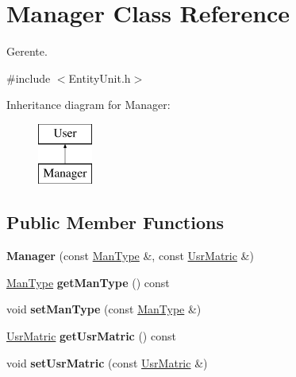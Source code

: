 \hypertarget{classManager}{\section{Manager Class Reference}
\label{classManager}
}


Gerente.  




{\ttfamily \#include $<$Entity\-Unit.\-h$>$}

Inheritance diagram for Manager\-:\begin{figure}[H]
\begin{center}
\leavevmode
\includegraphics[height=2.000000cm]{classManager}
\end{center}
\end{figure}
\subsection*{Public Member Functions}
\begin{DoxyCompactItemize}
\item 
\hypertarget{classManager_a94970a1ec6602001373fbd9be7bbbba5}{{\bfseries Manager} (const \hyperlink{classUsrType}{Man\-Type} \&, const \hyperlink{classUsrMatric}{Usr\-Matric} \&)}\label{classManager_a94970a1ec6602001373fbd9be7bbbba5}

\item 
\hypertarget{classManager_a255ac6a7e2112631001296fa8db3811b}{\hyperlink{classUsrType}{Man\-Type} {\bfseries get\-Man\-Type} () const }\label{classManager_a255ac6a7e2112631001296fa8db3811b}

\item 
\hypertarget{classManager_a3d4e9cb6cc0e8d9be47fcc086b4e584e}{void {\bfseries set\-Man\-Type} (const \hyperlink{classUsrType}{Man\-Type} \&)}\label{classManager_a3d4e9cb6cc0e8d9be47fcc086b4e584e}

\item 
\hypertarget{classManager_a462f3704b016b57e087db417df73f07a}{\hyperlink{classUsrMatric}{Usr\-Matric} {\bfseries get\-Usr\-Matric} () const }\label{classManager_a462f3704b016b57e087db417df73f07a}

\item 
\hypertarget{classManager_a93309a0dde84dd0b5fe90d9e1da49822}{void {\bfseries set\-Usr\-Matric} (const \hyperlink{classUsrMatric}{Usr\-Matric} \&)}\label{classManager_a93309a0dde84dd0b5fe90d9e1da49822}

\end{DoxyCompactItemize}


